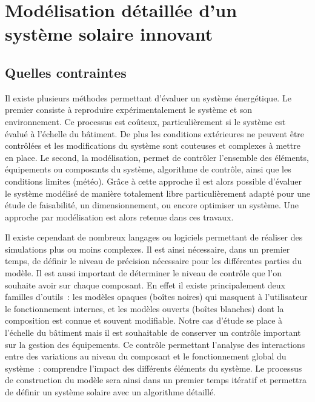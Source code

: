 
\section{Modélisation détaillée d’un système solaire innovant} %
\label{sec:modelisation_detaillee_d_un_systeme_solaire_innovant}
\subsection{Quelles contraintes} %
\label{sub:quelles_contraintes}
Il existe plusieurs méthodes permettant d’évaluer un système énergétique. Le premier
consiste à reproduire expérimentalement le système et son environnement. Ce processus est
coûteux, particulièrement si le système est évalué à l’échelle du bâtiment. De plus les
conditions extérieures ne peuvent être contrôlées et les modifications du système sont couteuses et complexes à mettre en place.
Le second, la modélisation, permet de contrôler l’ensemble des éléments, équipements ou composants du système,
algorithme de contrôle, ainsi que les conditions limites (météo).
Grâce à cette approche il est alors possible d’évaluer le système modélisé de
manière totalement libre particulièrement adapté pour une
étude de faisabilité, un dimensionnement, ou encore optimiser un système. Une approche par
modélisation est alors retenue dans ces travaux.

Il existe cependant de nombreux langages ou logiciels permettant de réaliser des
simulations plus ou moins complexes. Il est ainsi nécessaire, dans un premier temps, de
définir le niveau de précision nécessaire pour les différentes parties du modèle. Il est
aussi important de déterminer le niveau de contrôle que l’on souhaite avoir sur chaque
composant. En effet il existe principalement deux familles d’outils~: les modèles opaques
(boîtes noires) qui masquent à l’utilisateur le fonctionnement internes, et les modèles
ouverts (boîtes blanches) dont la composition est connue et souvent modifiable. Notre cas
d’étude se place à l’échelle du bâtiment mais il est souhaitable de conserver un contrôle
important sur la gestion des équipements. Ce contrôle permettant l’analyse des
interactions entre des variations au niveau du composant et le fonctionnement global du
système~: comprendre l’impact des différents éléments du système. Le processus de
construction du modèle sera ainsi dans un premier temps itératif et permettra de définir
un système solaire avec un algorithme détaillé.

